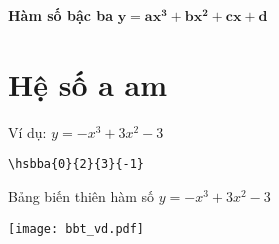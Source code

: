\documentclass[12pt,a4paper]{article}
\begin{document}
\parindent=0pt

\begin{center}
{\Large \textbf{Hàm số bậc ba} $\mathbf{y=ax^3+bx^2+cx+d}$}
\end{center}


\section{Hệ số $\mathbf{a}$ am}

Ví dụ:  $y=-x^3+3x^2-3$

\begin{verbatim}
\hsbba{0}{2}{3}{-1}
\end{verbatim}

\immediate{}

Bảng biến thiên hàm số $y=-x^3+3x^2-3$\bigskip 

\texttt{[image: bbt\_vd.pdf]}
\end{document}

